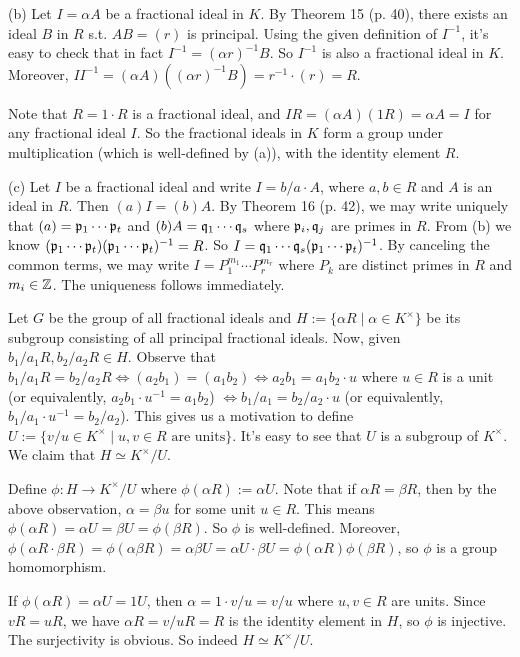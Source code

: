 \documentclass[../Marcus.tex]{subfiles}
\begin{document}
(b) Let $I=\alpha A$ be a fractional ideal in $K$. By Theorem 15 (p. 40), there exists an ideal $B$ in $R$ s.t. $AB=(r)$ is principal. Using the given definition of $I^{-1}$, it's easy to check that in fact $I^{-1}=(\alpha r)^{-1}B$. So $I^{-1}$ is also a fractional ideal in $K$. Moreover, $II^{-1}=(\alpha A)((\alpha r)^{-1}B)=r^{-1}\cdot(r)=R$.

Note that $R=1\cdot R$ is a fractional ideal, and $IR=(\alpha A)(1R)=\alpha A=I$ for any fractional ideal $I$. So the fractional ideals in $K$ form a group under multiplication (which is well-defined by (a)), with the identity element $R$.

(c) Let $I$ be a fractional ideal and write $I=b/a\cdot A$, where $a,b\in R$ and $A$ is an ideal in $R$. Then $(a)I=(b)A$. By Theorem 16 (p. 42), we may write uniquely that $(a)=\mathfrak{p}_1\cdots\mathfrak{p}_t$ and $(b)A=\mathfrak{q}_1\cdots\mathfrak{q}_s$ where $\mathfrak{p}_i,\mathfrak{q}_j$ are primes in $R$. From (b) we know $(\mathfrak{p}_1\cdots\mathfrak{p}_t)(\mathfrak{p}_1\cdots\mathfrak{p}_t)^{-1}=R$. So $I=\mathfrak{q}_1\cdots\mathfrak{q}_s(\mathfrak{p}_1\cdots\mathfrak{p}_t)^{-1}$. By canceling the common terms, we may write $I=P_1^{m_1}\cdots P_r^{m_r}$ where $P_k$ are distinct primes in $R$ and $m_i\in\mathbb{Z}$. The uniqueness follows immediately.

Let $G$ be the group of all fractional ideals and $H:=\{\alpha R\mid \alpha\in K^\times\}$ be its subgroup consisting of all principal fractional ideals. Now, given $b_1/a_1R, b_2/a_2R\in H$. Observe that $b_1/a_1R=b_2/a_2R \iff (a_2b_1)=(a_1b_2) \iff a_2b_1=a_1b_2\cdot u$ where $u\in R$ is a unit (or equivalently, $a_2b_1\cdot u^{-1}=a_1b_2$) $\iff b_1/a_1=b_2/a_2\cdot u$ (or equivalently, $b_1/a_1\cdot u^{-1}=b_2/a_2$). This gives us a motivation to define $U:=\{v/u\in K^\times\mid u,v\in R\text{ are units}\}$. It's easy to see that $U$ is a subgroup of $K^\times$. We claim that $H\simeq K^\times/U$.

Define $\phi:H\to K^\times/U$ where $\phi(\alpha R):=\alpha U$. Note that if $\alpha R=\beta R$, then by the above observation, $\alpha=\beta u$ for some unit $u\in R$. This means $\phi(\alpha R)=\alpha U=\beta U=\phi(\beta R)$. So $\phi$ is well-defined. Moreover, $\phi(\alpha R\cdot \beta R)=\phi(\alpha\beta R)=\alpha\beta U=\alpha U\cdot \beta U=\phi(\alpha R)\phi(\beta R)$, so $\phi$ is a group homomorphism.

If $\phi(\alpha R)=\alpha U=1U$, then $\alpha=1\cdot v/u=v/u$ where $u,v\in R$ are units. Since $vR=uR$, we have $\alpha R=v/u R = R$ is the identity element in $H$, so $\phi$ is injective. The surjectivity is obvious. So indeed $H\simeq K^\times/U$.
\end{document}
